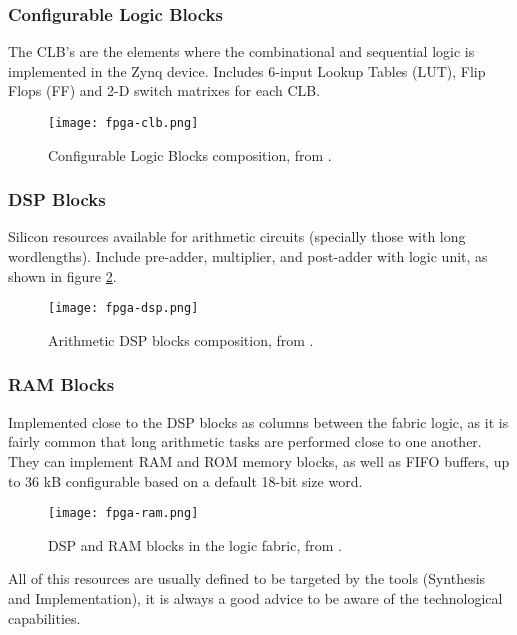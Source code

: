 \subsubsection{Configurable Logic Blocks}

The CLB's are the elements where the combinational and sequential logic is implemented in the Zynq
device. Includes 6-input Lookup Tables (LUT), Flip Flops (FF) and 2-D switch matrixes for each CLB.

\begin{figure}[htp]
	\centering
	\texttt{[image: fpga-clb.png]}
	\caption{Configurable Logic Blocks composition, from \cite{Crokett2014}.}
	\label{fig:fpga-clb}
\end{figure}

\subsubsection{DSP Blocks}

Silicon resources available for arithmetic circuits (specially those with long wordlengths). Include
pre-adder, multiplier, and post-adder with logic unit, as shown in figure \ref{fig:fpga-dsp}.

\begin{figure}[htp]
	\centering
	\texttt{[image: fpga-dsp.png]}
	\caption{Arithmetic DSP blocks composition, from \cite{Crokett2014}.}
	\label{fig:fpga-dsp}
\end{figure}

\subsubsection{RAM Blocks}

Implemented close to the DSP blocks as columns between the fabric logic, as it is fairly common that
long arithmetic tasks are performed close to one another. They can implement RAM and ROM memory
blocks, as well as FIFO buffers, up to 36 kB configurable based on a default 18-bit size word.

\begin{figure}[htp]
	\centering
	\texttt{[image: fpga-ram.png]}
	\caption{DSP and RAM blocks in the logic fabric, from \cite{Crokett2014}.}
	\label{fig:fpga-ram}
\end{figure}

All of this resources are usually defined to be targeted by the tools (Synthesis and
Implementation), it is always a good advice to be aware of the technological capabilities.

